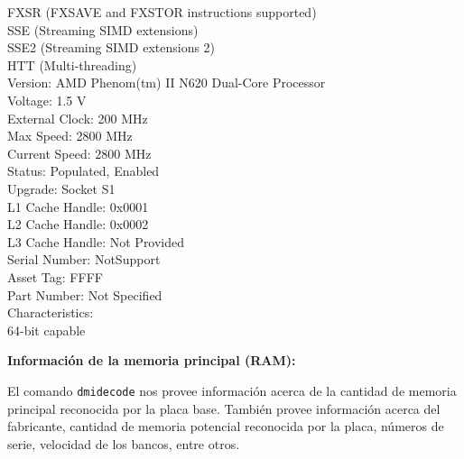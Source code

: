 \documentclass[12pt]{article}
\begin{document}
{{{{		FXSR (FXSAVE and FXSTOR instructions supported)\\
		SSE (Streaming SIMD extensions)\\
		SSE2 (Streaming SIMD extensions 2)\\
		HTT (Multi-threading)\\
	Version: AMD Phenom(tm) II N620 Dual-Core Processor\\
	Voltage: 1.5 V\\
	External Clock: 200 MHz\\
	Max Speed: 2800 MHz\\
	Current Speed: 2800 MHz\\
	Status: Populated, Enabled\\
	Upgrade: Socket S1\\
	L1 Cache Handle: 0x0001\\
	L2 Cache Handle: 0x0002\\
	L3 Cache Handle: Not Provided\\
	Serial Number: NotSupport\\
	Asset Tag: FFFF\\
	Part Number: Not Specified\\
	Characteristics:\\
		64-bit capable
}
} \vspace*{0.5cm} } } 

\textbf{Información de la memoria principal (RAM):}

El comando \texttt{dmidecode} nos provee información acerca de la cantidad de memoria 
principal reconocida por la placa base. También provee información acerca del fabricante, 
cantidad de memoria potencial reconocida por la placa, números de serie, velocidad de los
bancos, entre otros. 
\end{document}

